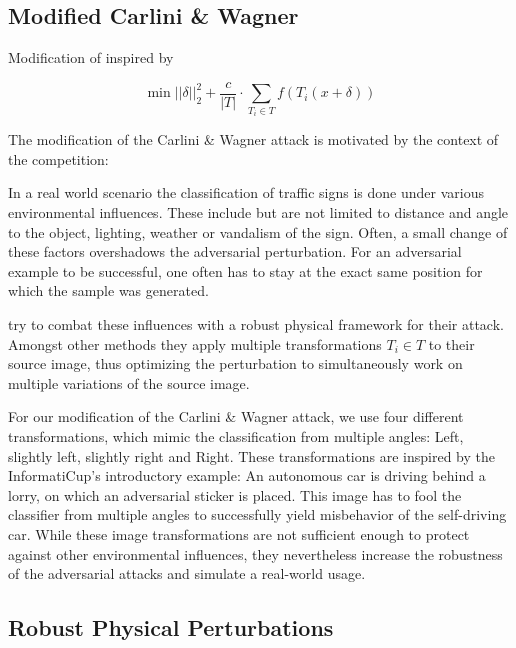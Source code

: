 \subsection{Modified Carlini \& Wagner}\label{subsec:cwl2_mod}

Modification of \cite{carlini2017towards} inspired by \cite{eykholt2018robust}

\begin{equation}
\min ||\delta||^2_2 + \frac{c}{|T|} \cdot \sum_{T_i \in T} f(T_i(x + \delta))
\end{equation}

The modification of the Carlini \& Wagner attack is motivated by the context of the competition:

In a real world scenario the classification of traffic signs is done under various environmental influences.
These include but are not limited to distance and angle to the object, lighting, weather or vandalism of the sign.
Often, a small change of these factors overshadows the adversarial perturbation. %
For an adversarial example to be successful, one often has to stay at the exact same position for which the sample was generated. 

\citet{eykholt2018robust} try to combat these influences with a robust physical framework for their attack.
Amongst other methods they apply multiple transformations $T_i \in T$ to their source image,
thus optimizing the perturbation to simultaneously work on multiple variations of the source image.

For our modification of the Carlini \& Wagner attack, we use four different transformations,
which mimic the classification from multiple angles: Left, slightly left, slightly right and Right.
These transformations are inspired by the InformatiCup's introductory example:
An autonomous car is driving behind a lorry, on which an adversarial sticker is placed.
This image has to fool the classifier from multiple angles to successfully yield misbehavior of the self-driving car.
While these image transformations are not sufficient enough to protect against other environmental influences, they nevertheless increase the robustness of the adversarial attacks and simulate a real-world usage.

\subsection{Robust Physical Perturbations}\label{subsec:robustphysical}

